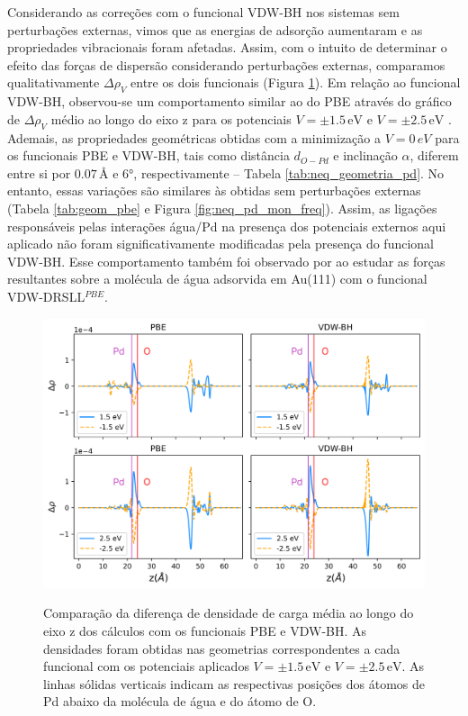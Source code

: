Considerando as correções com o funcional VDW-BH nos sistemas sem perturbações externas, vimos que as energias de adsorção aumentaram e as propriedades vibracionais foram afetadas. Assim, com o intuito de determinar o efeito das forças de dispersão considerando perturbações externas, comparamos qualitativamente $ \Delta \rho_{V} $ entre os dois funcionais (Figura \ref{fig:pd_zcharge}). Em relação ao funcional VDW-BH, observou-se um comportamento similar ao do PBE através do gráfico de $ \Delta \rho_{V} $ médio ao longo do eixo z para os potenciais $ V=\pm1.5\,\si{\eV}$ e $ V=\pm2.5\,\si{\eV} $ . Ademais, as propriedades geométricas obtidas com a minimização a $ V=0\,\si{eV} $ para os funcionais PBE e VDW-BH, tais como distância $ d_{O-Pd} $ e inclinação $ \alpha $, diferem entre si por $ 0.07\,\si{\angstrom} $ e $ 6\si{\degree} $, respectivamente -- Tabela \ref{tab:neq_geometria_pd}. No entanto, essas variações são similares às obtidas sem perturbações externas (Tabela \ref{tab:geom_pbe} e Figura \ref{fig:neq_pd_mon_freq}). Assim, as ligações responsáveis pelas interações água/Pd na presença dos potenciais externos aqui aplicado não foram significativamente modificadas pela presença do funcional VDW-BH. Esse comportamento também foi observado por \citeauthor{artigo-luana} ao estudar as forças resultantes sobre a molécula de água adsorvida em Au(111) com o funcional VDW-DRSLL$ ^{PBE} $. 


\begin{figure}[t!]
	\centering
	\caption{Comparação da diferença de densidade de carga média ao longo do eixo z dos cálculos com os funcionais PBE e VDW-BH. As densidades foram obtidas nas geometrias correspondentes a cada funcional com os potenciais aplicados $V=\pm 1.5\,\si{\eV} $ e $V=\pm2.5\,\si{\eV}$. As linhas sólidas verticais indicam as respectivas posições dos átomos de Pd abaixo da molécula de água e do átomo de O.}
	\includegraphics[scale=0.1]{figs/pd_densidade.png}
	\label{fig:pd_zcharge}
\end{figure}

